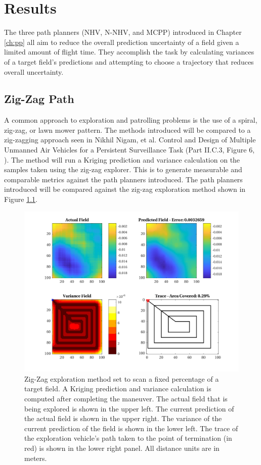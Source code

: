 \chapter{Results}
The three path planners (NHV, N-NHV, and MCPP) introduced in Chapter \ref{ch:pp} all aim to reduce the overall prediction uncertainty of a field given a limited amount of flight time. They accomplish the task by calculating variances of a target field's predictions and attempting to choose a trajectory that reduces overall uncertainty. 

\section{Zig-Zag Path}
A common approach to exploration and patrolling problems is the use of a spiral, zig-zag, or lawn mower pattern. The methods introduced will be compared to a zig-zagging approach seen in Nikhil Nigam, et al. Control and Design of Multiple Unmanned Air Vehicles for a Persistent Surveillance Task (Part II.C.3, Figure 6, \cite{nigam:zigzag}). The method will run a Kriging prediction and variance calculation on the samples taken using the zig-zag explorer. This is to generate measurable and comparable metrics against the path planners introduced. The path planners introduced will be compared against the zig-zag exploration method shown in Figure \ref{fig:zigzag4}.

\begin{figure}[hbt!]
    \centering
    \includegraphics[width=0.9\linewidth]{figures/hbresults/zz_10p_100x100_sf_25_seed_2.png}
    \captionsetup{skip=0.20\baselineskip}
    \ssp
    \caption{Zig-Zag exploration method set to scan a fixed percentage of a target field. A Kriging prediction and variance calculation is computed after completing the maneuver. The actual field that is being explored is shown in the upper left. The current prediction of the actual field is shown in the upper right. The variance of the current prediction of the field is shown in the lower left. The trace of the exploration vehicle's path taken to the point of termination (in red) is shown in the lower right panel. All distance units are in meters.}
    \label{fig:zigzag4}
\end{figure}

